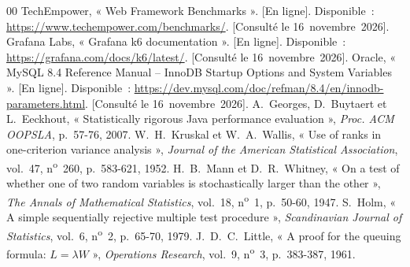 \documentclass[conference,a4paper]{IEEEtran}
\begin{document}
\begin{thebibliography}{00}
 TechEmpower, « Web Framework Benchmarks ». [En
ligne]. Disponible~: \url{https://www.techempower.com/benchmarks/}.
[Consulté le 16~novembre~2026].
 Grafana Labs, « Grafana k6 documentation ». [En ligne].
Disponible~: \url{https://grafana.com/docs/k6/latest/}. [Consulté le
16~novembre~2026].
 Oracle, « MySQL 8.4 Reference Manual -- InnoDB Startup
Options and System Variables ». [En ligne]. Disponible~:
\url{https://dev.mysql.com/doc/refman/8.4/en/innodb-parameters.html}.
[Consulté le 16~novembre~2026].
 A.~Georges, D.~Buytaert et L.~Eeckhout,
« Statistically rigorous Java performance evaluation »,
\textit{Proc. ACM OOPSLA}, p.~57-76, 2007.
 W.~H.~Kruskal et W.~A.~Wallis, « Use of ranks in
one-criterion variance analysis », \textit{Journal of the American
Statistical Association}, vol.~47, n\textsuperscript{o}~260,
p.~583-621, 1952.
 H.~B.~Mann et D.~R.~Whitney, « On a test of
whether one of two random variables is stochastically larger than the
other », \textit{The Annals of Mathematical Statistics}, vol.~18,
n\textsuperscript{o}~1, p.~50-60, 1947.
 S.~Holm, « A simple sequentially rejective multiple test
procedure », \textit{Scandinavian Journal of Statistics}, vol.~6,
n\textsuperscript{o}~2, p.~65-70, 1979.
 J.~D.~C.~Little, « A proof for the queuing formula:
$L = \lambda W$ », \textit{Operations Research}, vol.~9,
n\textsuperscript{o}~3, p.~383-387, 1961.
\end{thebibliography}
\end{document}
